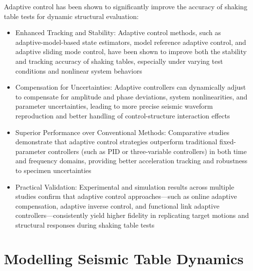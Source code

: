 \documentclass[9pt]{extarticle}
\begin{document}
Adaptive control has been shown to significantly improve the accuracy of shaking table tests for dynamic structural evaluation:
\begin{itemize}
    \item Enhanced Tracking and Stability: Adaptive control methods, such as adaptive-model-based state estimators, model reference adaptive control, and adaptive sliding mode control, have been shown to improve both the stability and tracking accuracy of shaking tables, especially under varying test conditions and nonlinear system behaviors %
    \item Compensation for Uncertainties: Adaptive controllers can dynamically adjust to compensate for amplitude and phase deviations, system nonlinearities, and parameter uncertainties, leading to more precise seismic waveform reproduction and better handling of control-structure interaction effects %
    \item     Superior Performance over Conventional Methods: Comparative studies demonstrate that adaptive control strategies outperform traditional fixed-parameter controllers (such as PID or three-variable controllers) in both time and frequency domains, providing better acceleration tracking and robustness to specimen uncertainties %
    \item     Practical Validation: Experimental and simulation results across multiple studies confirm that adaptive control approaches—such as online adaptive compensation, adaptive inverse control, and functional link adaptive controllers—consistently yield higher fidelity in replicating target motions and structural responses during shaking table tests %
\end{itemize}




\section{Modelling Seismic Table Dynamics}\label{Modelling Seismic Table Dynamics}
\end{document}
